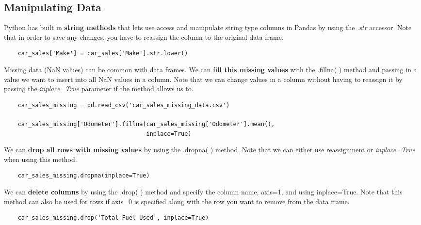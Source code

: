 \documentclass[11pt, a4paper]{article}
\begin{document}
\begin{spacing}{1.1}
	\subsection{Manipulating Data}
	Python has built in \textbf{string methods} that lets use access and manipulate string type columns in Pandas by using the \textit{.str} accessor. Note that in order to save any changes, you have to reassign the column to the original data frame. 
	\begin{lstlisting}
	car_sales['Make'] = car_sales['Make'].str.lower() \end{lstlisting} \vspace*{1mm} 
	Missing data (NaN values) can be common with data frames. We can \textbf{fill this missing values} with the .fillna( ) method and passing in a value we want to insert into all NaN values in a column. Note that we can change values in a column without having to reassign it by passing the \textit{inplace=True} parameter if the method allows us to.
	\begin{lstlisting}
	car_sales_missing = pd.read_csv('car_sales_missing_data.csv')
	
	car_sales_missing['Odometer'].fillna(car_sales_missing['Odometer'].mean(), 
	                                     inplace=True) \end{lstlisting} \vspace*{1mm} 
	We can \textbf{drop all rows with missing values} by using the .dropna( ) method. Note that we can either use reassignment or \textit{inplace=True} when using this method. 
	\begin{lstlisting}
	car_sales_missing.dropna(inplace=True) \end{lstlisting} \vspace*{1mm} 
	We can \textbf{delete columns} by using the .drop( ) method and specify the column name, axis=1, and using inplace=True. Note that this method can also be used for rows if axis=0 is specified along with the row you want to remove from the data frame. 
	\begin{lstlisting}
	car_sales_missing.drop('Total Fuel Used', inplace=True) \end{lstlisting} \newpage


\end{spacing}
\end{document}
